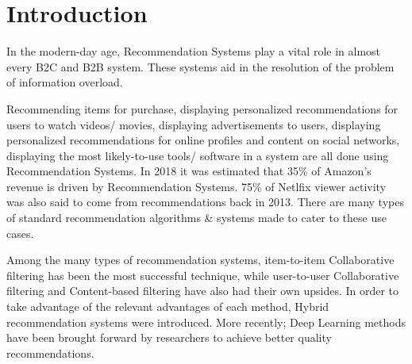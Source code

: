 \documentclass[manuscript,screen,natbib=false]{acmart}
\begin{document}




\maketitle

\section{Introduction}
In the modern-day age, Recommendation Systems play a vital role in almost every B2C and B2B system. These systems aid in the resolution of the problem of information overload.

Recommending items for purchase, displaying personalized recommendations for users to watch videos/ movies, displaying advertisements to users, displaying personalized recommendations for online profiles and content on social networks, displaying the most likely-to-use tools/ software in a system are all done using Recommendation Systems. In 2018 it was estimated that 35\% of Amazon's revenue \cite{naumov_deep_2019} is driven by Recommendation Systems. 75\% of Netlfix viewer activity \cite{vanderbilt_science_nodate} was also said to come from recommendations back in 2013. There are many types of standard recommendation algorithms \& systems made to cater to these use cases. 

Among the many types of recommendation systems, item-to-item Collaborative filtering has been the most successful technique, while user-to-user Collaborative filtering and Content-based filtering have also had their own upsides. In order to take advantage of the relevant advantages of each method, Hybrid recommendation systems were introduced. More recently; Deep Learning methods have been brought forward by researchers to achieve better quality recommendations.
\end{document}
